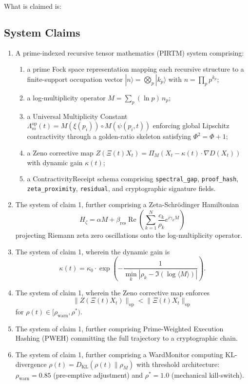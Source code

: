 \documentclass[12pt]{article}
\theoremstyle{plain}
\theoremstyle{definition}
\theoremstyle{remark}
\begin{document}
What is claimed is:

\subsection{System Claims}

\begin{enumerate}
    \item A prime-indexed recursive tensor mathematics (PIRTM) system comprising:
    \begin{enumerate}
        \item a prime Fock space representation mapping each recursive structure to a finite-support occupation vector $|n\rangle = \bigotimes_{p} |k_p\rangle$ with $n = \prod_{p} p^{k_p}$;
        \item a log-multiplicity operator $M = \sum_{p} (\ln p)\, n_p$;
        \item a Universal Multiplicity Constant $\Lambda_m^{\text{op}}(t) = M(\xi(p_i)) \circ M(\psi(p_i, t))$ enforcing global Lipschitz contractivity through a golden-ratio skeleton satisfying $\Phi^2 = \Phi + 1$;
        \item a Zeno corrective map $Z(\Xi(t)X_t) = \Pi_M(X_t - \kappa(t)\cdot \nabla D(X_t))$ with dynamic gain $\kappa(t)$;
        \item a ContractivityReceipt schema comprising \texttt{spectral\_gap}, \texttt{proof\_hash}, \texttt{zeta\_proximity}, \texttt{residual}, and cryptographic signature fields.
    \end{enumerate}

    \item The system of claim 1, further comprising a Zeta-Schrödinger Hamiltonian
    \[
    H_\zeta = \alpha M + \beta_{\text{res}} \operatorname{Re}\left( \sum_{k=1}^N \frac{c_k}{\rho_k} e^{i\gamma_k M} \right)
    \]
    projecting Riemann zeta zero oscillations onto the log-multiplicity operator.

    \item The system of claim 1, wherein the dynamic gain is
    \[
    \kappa(t) = \kappa_0 \cdot \exp\left( -\frac{1}{\min_k |\rho_k - \Im(\log \langle M \rangle)|} \right).
    \]

    \item The system of claim 1, wherein the Zeno corrective map enforces
    \[
    \|Z(\Xi(t)X_t)\|_{\text{op}} < \|\Xi(t)X_t\|_{\text{op}}
    \]
    for $\rho(t) \in [\rho_{\text{warn}}, \rho^*)$.

    \item The system of claim 1, further comprising Prime-Weighted Execution Hashing (PWEH) committing the full trajectory to a cryptographic chain.

    \item The system of claim 1, further comprising a WardMonitor computing KL-divergence $\rho(t) = D_{\text{KL}}(\rho(t) \| \rho_M)$ with threshold architecture: $\rho_{\text{warn}} = 0.85$ (pre-emptive adjustment) and $\rho^* = 1.0$ (mechanical kill-switch).
\end{enumerate}
\end{document}
